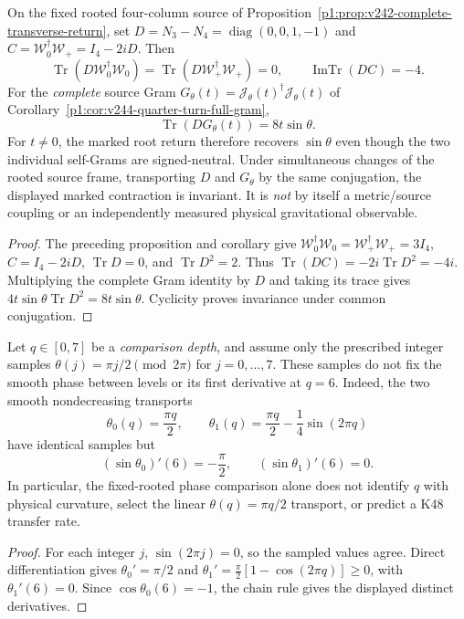 \documentclass[11pt]{article}
\begin{document}
\begin{corollary}
\label{p1:cor:v3030-rooted-imaginary-coherence}
On the fixed rooted four-column source of
Proposition~\ref{p1:prop:v242-complete-transverse-return}, set
\(D=N_3-N_4=\operatorname{diag}(0,0,1,-1)\) and
\(C=\mathcal W_0^\dagger\mathcal W_+=I_4-2iD\).
Then
\[
 \operatorname{Tr}(D\mathcal W_0^\dagger\mathcal W_0)
 =\operatorname{Tr}(D\mathcal W_+^\dagger\mathcal W_+)=0,
 \qquad \boxed{\operatorname{ImTr}(DC)=-4.}
\]
For the \emph{complete} source Gram
\(G_\theta(t)=\mathcal J_\theta(t)^\dagger\mathcal J_\theta(t)\)
of Corollary~\ref{p1:cor:v244-quarter-turn-full-gram},
\[
 \boxed{\operatorname{Tr}(DG_\theta(t))=8t\sin\theta.}
\]
For \(t\ne0\), the marked root return therefore recovers
\(\sin\theta\) even though the two individual self-Grams are
signed-neutral.  Under simultaneous changes of the rooted source
frame, transporting \(D\) and \(G_\theta\) by the same conjugation,
the displayed marked contraction is invariant.  It is \emph{not}
by itself a metric/source coupling or an independently measured
physical gravitational observable.
\end{corollary}
\begin{proof}
The preceding proposition and corollary give
\(\mathcal W_0^\dagger\mathcal W_0=
\mathcal W_+^\dagger\mathcal W_+=3I_4\),
\(C=I_4-2iD\), \(\operatorname{Tr}D=0\), and
\(\operatorname{Tr}D^2=2\). Thus
\(\operatorname{Tr}(DC)=-2i\operatorname{Tr}D^2=-4i\).
Multiplying the complete Gram identity by \(D\) and taking its
trace gives \(4t\sin\theta\operatorname{Tr}D^2=8t\sin\theta\).
Cyclicity proves invariance under common conjugation.
\end{proof}

\begin{proposition}
\label{p1:prop:v3030-phase-sample-nonuniqueness}
Let \(q\in[0,7]\) be a \emph{comparison depth}, and assume only
the prescribed integer samples \(\theta(j)=\pi j/2\pmod{2\pi}\)
for \(j=0,\ldots,7\). These samples do not fix the smooth
phase between levels or its first derivative at \(q=6\).
Indeed, the two smooth nondecreasing transports
\[
 \theta_0(q)=\frac{\pi q}{2},\qquad
 \theta_1(q)=\frac{\pi q}{2}-\frac14\sin(2\pi q)
\]
have identical samples but
\[
 \boxed{(\sin\theta_0)'(6)=-\frac\pi2,
 \qquad (\sin\theta_1)'(6)=0.}
\]
In particular, the fixed-rooted phase comparison alone does not
identify \(q\) with physical curvature, select the linear
\(\theta(q)=\pi q/2\) transport, or predict a K48 transfer rate.
\end{proposition}
\begin{proof}
For each integer \(j\), \(\sin(2\pi j)=0\), so the sampled
values agree.  Direct differentiation gives
\(\theta_0'=\pi/2\) and
\(\theta_1'=\frac\pi2[1-\cos(2\pi q)]\ge0\), with
\(\theta_1'(6)=0\).  Since \(\cos\theta_0(6)=-1\), the
chain rule gives the displayed distinct derivatives.
\end{proof}
\end{document}
